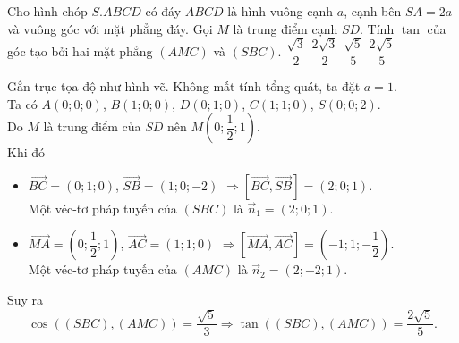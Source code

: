 \begin{ex}%
Cho hình chóp $S.ABCD$ có đáy $ABCD$ là hình vuông cạnh $a$, cạnh bên $SA = 2a$ và vuông góc với mặt phẳng đáy. Gọi $M$ là trung điểm cạnh $SD$. Tính $\tan$ của góc tạo bởi hai mặt phẳng $\left(AMC\right)$ và $\left(SBC\right)$.
\choice
{$\dfrac{\sqrt{3}}{2}$}
{$\dfrac{2\sqrt{3}}{2}$}
{$\dfrac{\sqrt{5}}{5}$}
{\True $\dfrac{2\sqrt{5}}{5}$}
\loigiai
{
\begin{center}
\end{center}
Gắn trục tọa độ như hình vẽ. Không mất tính tổng quát, ta đặt $a=1$.\\
Ta có $A\left(0;0;0\right)$, $B\left(1;0;0\right)$, $D\left(0;1;0\right)$, $C\left(1;1;0\right)$, $S\left(0;0;2\right)$.\\
Do $M$ là trung điểm của $SD$ nên $M\left(0;\dfrac{1}{2};1\right)$.\\
Khi đó 
\begin{itemize}
\item $\overrightarrow{BC} = \left(0;1;0\right)$, $\overrightarrow{SB} = \left(1;0;-2\right)$ $\Rightarrow \left[\overrightarrow{BC},\overrightarrow{SB}\right] = \left(2;0;1\right)$. \\
Một véc-tơ pháp tuyến của $\left(SBC\right)$ là $\overrightarrow{n}_1 = \left(2;0;1\right)$.
\item $\overrightarrow{MA} = \left(0;\dfrac{1}{2};1\right)$, $\overrightarrow{AC} = \left(1;1;0\right)$ $\Rightarrow\left[\overrightarrow{MA},\overrightarrow{AC}\right] = \left(-1;1;-\dfrac{1}{2}\right)$. \\
Một véc-tơ pháp tuyến của $\left(AMC\right)$ là $\overrightarrow{n}_2 = \left(2;-2;1\right)$.
\end{itemize}
Suy ra 
\[\cos\left(\left(SBC\right),\left(AMC\right)\right) = \dfrac{\sqrt{5}}{3}\Rightarrow \tan \left(\left(SBC\right),\left(AMC\right)\right) = \dfrac{2\sqrt{5}}{5}.\]
}
\end{ex}

